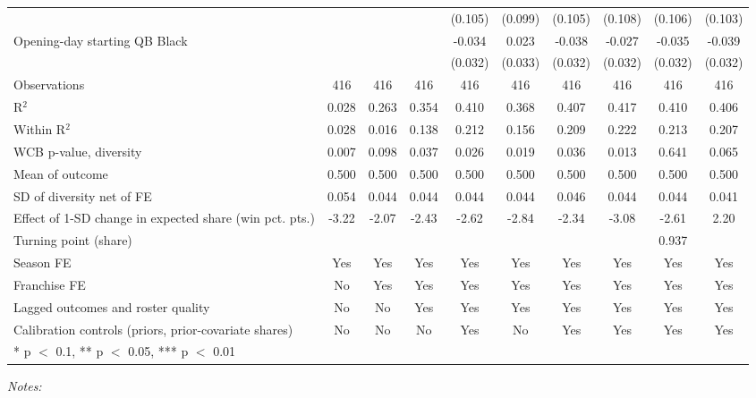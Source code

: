 \begin{table}[!h]
{\begin{threeparttable}
\begin{tabular}[t]{lccccccccc}
 &  &  &  & (0.105) & (0.099) & (0.105) & (0.108) & (0.106) & (0.103)\\
Opening-day starting QB Black &  &  &  & -0.034 & 0.023 & -0.038 & -0.027 & -0.035 & -0.039\\
 &  &  &  & (0.032) & (0.033) & (0.032) & (0.032) & (0.032) & (0.032)\\
\midrule
Observations & 416 & 416 & 416 & 416 & 416 & 416 & 416 & 416 & 416\\
R$^2$ & 0.028 & 0.263 & 0.354 & 0.410 & 0.368 & 0.407 & 0.417 & 0.410 & 0.406\\
Within R$^2$ & 0.028 & 0.016 & 0.138 & 0.212 & 0.156 & 0.209 & 0.222 & 0.213 & 0.207\\
WCB p-value, diversity & 0.007 & 0.098 & 0.037 & 0.026 & 0.019 & 0.036 & 0.013 & 0.641 & 0.065\\
Mean of outcome & 0.500 & 0.500 & 0.500 & 0.500 & 0.500 & 0.500 & 0.500 & 0.500 & 0.500\\
SD of diversity net of FE & 0.054 & 0.044 & 0.044 & 0.044 & 0.044 & 0.046 & 0.044 & 0.044 & 0.041\\
Effect of 1-SD change in expected share (win pct. pts.) & -3.22 & -2.07 & -2.43 & -2.62 & -2.84 & -2.34 & -3.08 & -2.61 & 2.20\\
Turning point (share) &  &  &  &  &  &  &  & 0.937 & \\
Season FE & Yes & Yes & Yes & Yes & Yes & Yes & Yes & Yes & Yes\\
Franchise FE & No & Yes & Yes & Yes & Yes & Yes & Yes & Yes & Yes\\
Lagged outcomes and roster quality & No & No & Yes & Yes & Yes & Yes & Yes & Yes & Yes\\
Calibration controls (priors, prior-covariate shares) & No & No & No & Yes & No & Yes & Yes & Yes & Yes\\
\bottomrule
\multicolumn{10}{l}{\rule{0pt}{1em}* p $<$ 0.1, ** p $<$ 0.05, *** p $<$ 0.01}\\
\end{tabular}
\begin{tablenotes}[para]
\item \textit{Notes:} 

\end{tablenotes}
\end{threeparttable}}
\end{table}
